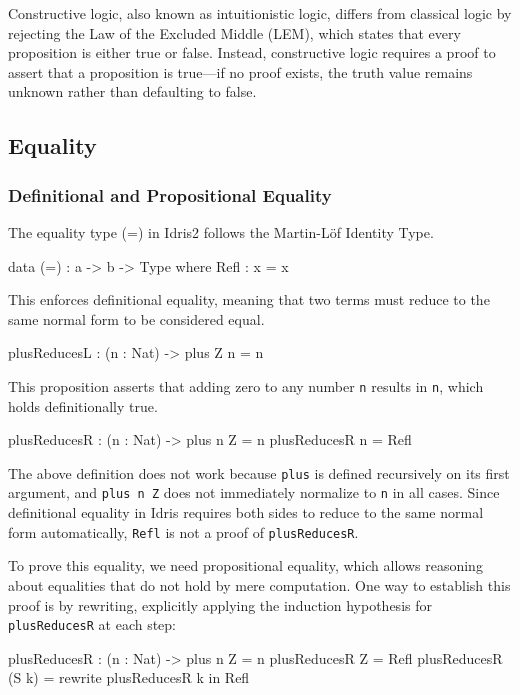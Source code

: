 \documentclass[]{rptuseminar}
\begin{document}
Constructive logic, also known as intuitionistic logic, differs from classical logic by rejecting the Law of the Excluded Middle (LEM), which states that every proposition is either true or false. Instead, constructive logic requires a proof to assert that a proposition is true—if no proof exists, the truth value remains unknown rather than defaulting to false.


\subsection{Equality}
\label{sec:Equality}

\subsubsection{Definitional and Propositional Equality}
The equality type (=) in Idris2 follows the Martin-Löf Identity Type.

\begin{idris}
data (=) : a -> b -> Type where  
Refl : x = x
\end{idris}

This enforces definitional equality, meaning that two terms must reduce to the same normal form to be considered equal.

\begin{idris}
plusReducesL : (n : Nat) -> plus Z n = n
\end{idris}

This proposition asserts that adding zero to any number \texttt{n} results in \texttt{n}, which holds definitionally true.

\begin{idris}
plusReducesR : (n : Nat) -> plus n Z = n
plusReducesR n = Refl
\end{idris}
The above definition does not work because \texttt{plus} is defined recursively on its first argument, and \texttt{plus n Z} does not immediately normalize to \texttt{n} in all cases. Since definitional equality in Idris requires both sides to reduce to the same normal form automatically, \texttt{Refl} is not a proof of \texttt{plusReducesR}.

To prove this equality, we need propositional equality, which allows reasoning about equalities that do not hold by mere computation. One way to establish this proof is by rewriting, explicitly applying the induction hypothesis for \texttt{plusReducesR} at each step:


\begin{idris}
plusReducesR : (n : Nat) -> plus n Z = n
plusReducesR Z = Refl 
plusReducesR (S k) = rewrite plusReducesR k in Refl  
\end{idris}
\end{document}
